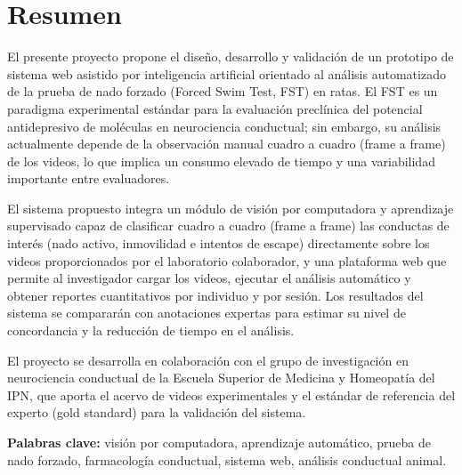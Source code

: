\chapter*{Resumen}

El presente proyecto propone el diseño, desarrollo y validación de un prototipo de sistema web asistido por inteligencia artificial orientado al análisis automatizado de la prueba de nado forzado (Forced Swim Test, FST) en ratas. El FST es un paradigma experimental estándar para la evaluación preclínica del potencial antidepresivo de moléculas en neurociencia conductual; sin embargo, su análisis actualmente depende de la observación manual cuadro a cuadro (frame a frame) de los videos, lo que implica un consumo elevado de tiempo y una variabilidad importante entre evaluadores.

El sistema propuesto integra un módulo de visión por computadora y aprendizaje supervisado capaz de clasificar cuadro a cuadro (frame a frame) las conductas de interés (nado activo, inmovilidad e intentos de escape) directamente sobre los videos proporcionados por el laboratorio colaborador, y una plataforma web que permite al investigador cargar los videos, ejecutar el análisis automático y obtener reportes cuantitativos por individuo y por sesión. Los resultados del sistema se compararán con anotaciones expertas para estimar su nivel de concordancia y la reducción de tiempo en el análisis.

El proyecto se desarrolla en colaboración con el grupo de investigación en neurociencia conductual de la Escuela Superior de Medicina y Homeopatía del IPN, que aporta el acervo de videos experimentales y el estándar de referencia del experto (gold standard) para la validación del sistema.


\noindent\textbf{Palabras clave:} visión por computadora, aprendizaje automático, prueba de nado forzado, farmacología conductual, sistema web, análisis conductual animal.